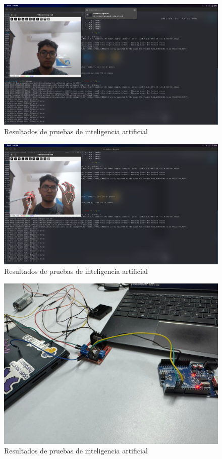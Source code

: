 \begin{figure}[H]
    \centering
    \includegraphics[width=1\textwidth]{img/PruebaIA5.png}
    \caption{Resultados de pruebas de inteligencia artificial}
    \label{fig:ai-test5}
\end{figure}

\begin{figure}[H]
    \centering
    \includegraphics[width=1\textwidth]{img/PruebaIA6.png}
    \caption{Resultados de pruebas de inteligencia artificial}
    \label{fig:ai-test6}
\end{figure}

\begin{figure}[H]
    \centering
    \includegraphics[width=1\textwidth]{img/PruebaIA7.png}
    \caption{Resultados de pruebas de inteligencia artificial}
    \label{fig:ai-test7}
\end{figure}

